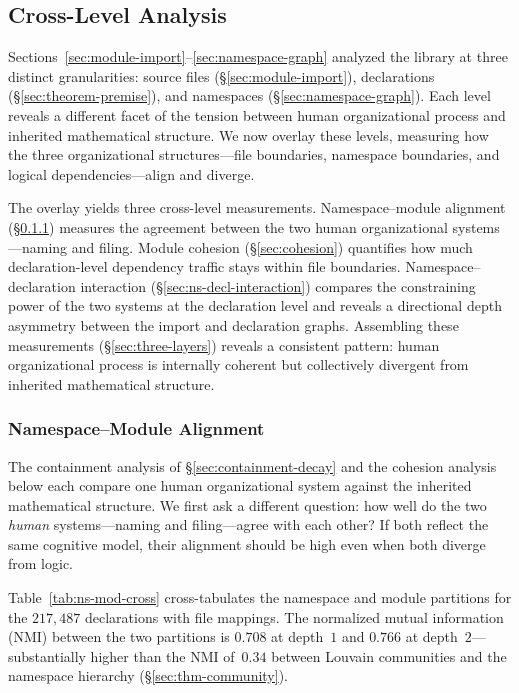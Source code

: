 \subsection{Cross-Level Analysis}
\label{sec:cross_level}
\label{sec:module-declaration}

Sections~\ref{sec:module-import}--\ref{sec:namespace-graph} analyzed the library at three distinct granularities: source files (\S\ref{sec:module-import}), declarations (\S\ref{sec:theorem-premise}), and namespaces (\S\ref{sec:namespace-graph}). Each level reveals a different facet of the tension between human organizational process and inherited mathematical structure. We now overlay these levels, measuring how the three organizational structures---file boundaries, namespace boundaries, and logical dependencies---align and diverge.

The overlay yields three cross-level measurements. Namespace--module alignment (\S\ref{sec:ns-mod-cross}) measures the agreement between the two human organizational systems---naming and filing. Module cohesion (\S\ref{sec:cohesion}) quantifies how much declaration-level dependency traffic stays within file boundaries. Namespace--declaration interaction (\S\ref{sec:ns-decl-interaction}) compares the constraining power of the two systems at the declaration level and reveals a directional depth asymmetry between the import and declaration graphs. Assembling these measurements (\S\ref{sec:three-layers}) reveals a consistent pattern: human organizational process is internally coherent but collectively divergent from inherited mathematical structure.

\subsubsection{Namespace--Module Alignment}
\label{sec:ns-mod-cross}

The containment analysis of \S\ref{sec:containment-decay} and the cohesion analysis below each compare one human organizational system against the inherited mathematical structure. We first ask a different question: how well do the two \emph{human} systems---naming and filing---agree with each other? If both reflect the same cognitive model, their alignment should be high even when both diverge from logic.

Table~\ref{tab:ns-mod-cross} cross-tabulates the namespace and module partitions for the $217{,}487$ declarations with file mappings. The normalized mutual information (NMI) between the two partitions is $0.708$ at depth~$1$ and $0.766$ at depth~$2$---substantially higher than the NMI of~$0.34$ between Louvain communities and the namespace hierarchy (\S\ref{sec:thm-community}).

